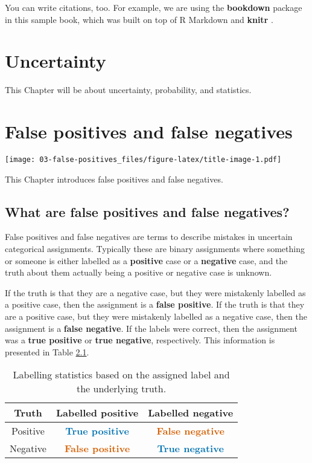 \documentclass[
]{book}
\begin{document}
You can write citations, too. For example, we are using the \textbf{bookdown} package \citep{R-bookdown} in this sample book, which was built on top of R Markdown and \textbf{knitr} \citep{xie2015}.

\hypertarget{uncertainty}{%
\chapter{Uncertainty}\label{uncertainty}}

This Chapter will be about uncertainty, probability, and statistics.

\hypertarget{false-positives}{%
\chapter{False positives and false negatives}\label{false-positives}}

\texttt{[image: 03-false-positives\_files/figure-latex/title-image-1.pdf]}

This Chapter introduces false positives and false negatives.

\hypertarget{what-are-false-positives-and-false-negatives}{%
\section{What are false positives and false negatives?}\label{what-are-false-positives-and-false-negatives}}

False positives and false negatives are terms to describe mistakes in uncertain categorical assignments. Typically these are binary assignments where something or someone is either labelled as a \textbf{positive} case or a \textbf{negative} case, and the truth about them actually being a positive or negative case is unknown.

If the truth is that they are a negative case, but they were mistakenly labelled as a positive case, then the assignment is a \textbf{false positive}. If the truth is that they are a positive case, but they were mistakenly labelled as a negative case, then the assignment is a \textbf{false negative}. If the labels were correct, then the assignment was a \textbf{true positive} or \textbf{true negative}, respectively. This information is presented in Table \ref{tab:intro-fp-table}.

\begin{table}

\caption{\label{tab:intro-fp-table}Labelling statistics based on the assigned label and the underlying truth.}
\centering
\begin{tabular}[t]{ccc}
\toprule
Truth & Labelled positive & Labelled negative\\
\midrule
\rowcolor{gray!6}  Positive & \textcolor[HTML]{0072B2}{\textbf{True positive}} & \textcolor[HTML]{D55E00}{\textbf{False negative}}\\
Negative & \textcolor[HTML]{D55E00}{\textbf{False positive}} & \textcolor[HTML]{0072B2}{\textbf{True negative}}\\
\bottomrule
\end{tabular}
\end{table}
\end{document}
